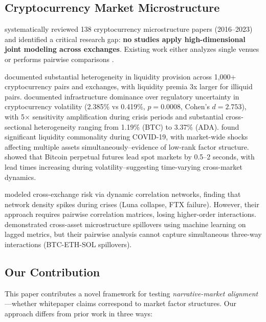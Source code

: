 \documentclass[11pt,twocolumn]{article}
\begin{document}
\subsection{Cryptocurrency Market Microstructure}

\citet{Almeida2024Cryptocurrency} systematically reviewed 138 cryptocurrency microstructure papers (2016--2023) and identified a critical research gap: \textbf{no studies apply high-dimensional joint modeling across exchanges}. Existing work either analyzes single venues \citep{Bozzetto2023Microstructure} or performs pairwise comparisons \citep{Wang2024CrossExchange}.

\citet{Bianchi2022Trading} documented substantial heterogeneity in liquidity provision across 1,000+ cryptocurrency pairs and exchanges, with liquidity premia 3x larger for illiquid pairs. \citet{Farzulla2025Cryptocurrency} documented infrastructure dominance over regulatory uncertainty in cryptocurrency volatility (2.385\% vs 0.419\%, $p = 0.0008$, Cohen's $d = 2.753$), with 5$\times$ sensitivity amplification during crisis periods and substantial cross-sectional heterogeneity ranging from 1.19\% (BTC) to 3.37\% (ADA). \citet{Liu2025LiquidityCommonality} found significant liquidity commonality during COVID-19, with market-wide shocks affecting multiple assets simultaneously--evidence of low-rank factor structure. \citet{DeFreitas2025HighFreq} showed that Bitcoin perpetual futures lead spot markets by 0.5--2 seconds, with lead times increasing during volatility--suggesting time-varying cross-market dynamics.

\citet{Wang2024CrossExchange} modeled cross-exchange risk via dynamic correlation networks, finding that network density spikes during crises (Luna collapse, FTX failure). However, their approach requires pairwise correlation matrices, losing higher-order interactions. \citet{Easley2024CrossAsset} demonstrated cross-asset microstructure spillovers using machine learning on lagged metrics, but their pairwise analysis cannot capture simultaneous three-way interactions (BTC-ETH-SOL spillovers).

\subsection{Our Contribution}

This paper contributes a novel framework for testing \textit{narrative-market alignment}---whether whitepaper claims correspond to market factor structures. Our approach differs from prior work in three ways:
\end{document}
